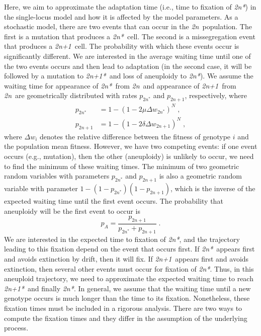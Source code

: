 \documentclass[12pt]{extarticle}
\newcommand{\euwt}{\emph{2n}}
\newcommand{\anwt}{\emph{2n+1}}
\newcommand{\eumt}{\emph{2n*}}
\newcommand{\anmt}{\emph{2n+1*}}
\begin{document}
Here, we aim to approximate the adaptation time (i.e., time to fixation of \eumt) in the single-locus model and how it is affected by the model parameters. As a stochastic model, there are two events that can occur in the \euwt\ population. The first is a mutation that produces a \eumt\ cell. The second is a missegregation event that produces a \anwt\ cell. The probability with which these events occur is significantly different. We are interested in the average waiting time until one of the two events occurs and then lead to adaptation (in the second case, it will be followed by a mutation to \anmt\ and loss of aneuploidy to \eumt).
We assume the waiting time for appearance of \eumt\ from \euwt\ and appearance of \anwt\ from \euwt\ are geometrically distributed with rates $p_{2n^*}$ and $p_{2n+1}$, respectively, where
\begin{subequations}
\begin{align}
p_{2n^*} &= 1-(1-2\mu \Delta w_{2n^*})^N \;, \\
p_{2n+1} &= 1-(1-2\delta\Delta w_{2n+1})^N \;,
\end{align}
\end{subequations}
where $\Delta w_i$ denotes the relative difference between the fitness of genotype $i$ and the population mean fitness.
However, we have two competing events: if one event occurs (e.g., mutation), then the other (aneuploidy) is unlikely to occur,  we need to find the minimum of these waiting times. The minimum of two geometric random variables with parameters $p_{2n^*}$ and $p_{2n+1}$ is also a geometric random variable with parameter $1-(1-p_{2n^*})(1-p_{2n+1})$, which is the inverse of the expected waiting time until the first event occurs.
The probability that aneuploidy will be the first event to occur is
\begin{equation}
p_A = \frac{p_{2n+1}}{p_{2n^*}+p_{2n+1}} \;.
\end{equation}
We are interested in the expected time to fixation of \eumt, and the trajectory leading to this fixation depend on the event that occurs first. If \eumt\ appears first and avoids extinction by drift, then it will fix. If \anwt\ appears first and avoids extinction, then several other events must occur for fixation of \eumt. Thus, in this aneuploid trajectory, we need to approximate the expected waiting time to reach \anmt\ and finally \eumt.
In general, we assume that the waiting time until a new genotype occurs is much longer than the time to its fixation. Nonetheless, these fixation times must be included in a rigorous analysis. There are two ways to compute the fixation times and they differ in the assumption of the underlying process.
\end{document}
